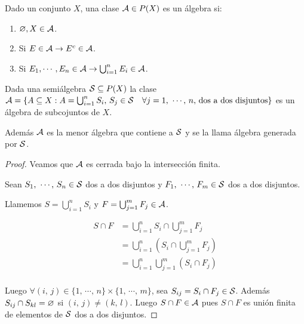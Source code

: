 \begin{definition}[Álgebra]
    Dado un conjunto $X$, una clase $\mathcal{A} \in P(X)$ es un álgebra si: \begin{enumerate}
        \item $\varnothing, X \in \mathcal{A}$.
        \item Si $E \in \mathcal{A} \to E^c \in \mathcal{A}$.
        \item Si $E_1, \cdots, E_n \in \mathcal{A} \to \bigcup_{i = 1}^n E_i \in \mathcal{A}$.
    \end{enumerate}
\end{definition}

\begin{lemma}
    Dada una semiálgebra $\mathcal{S} \subseteq P(X)$ la clase $\mathcal{A} = \{ A \subseteq X : A = \bigcup_{i = 1}^n S_i \text{, } S_j \in \mathcal{S} \quad \forall j = 1 \text{, }\cdots \text{, } n \text{, dos a dos disjuntos} \}$
    es un álgebra de subcojuntos de $X$.

    Además $\mathcal{A}$ es la menor álgebra que contiene a $\mathcal{S}$ y se la llama álgebra generada por $\mathcal{S}$.

    \begin{proof}
        Veamos que $\mathcal{A}$ es cerrada bajo la intersección finita.

        Sean $S_1 \text{, } \cdots \text{, } S_n \in \mathcal{S}$ dos a dos disjuntos y $F_1 \text{, } \cdots \text{, } F_m \in \mathcal{S}$ dos a dos disjuntos.

        Llamemos $S = \bigcup_{i = 1}^n S_i$ y $F = \bigcup_{j = 1}^m F_j \in \mathcal{A}$.

        \begin{align*}
            S \cap F & = \bigcup_{i = 1}^n S_i \cap \bigcup_{j = 1}^m F_j \\
            &= \bigcup_{i = 1}^n (S_i \cap \bigcup_{j = 1}^m F_j) \\
            &= \bigcup_{i = 1}^n \bigcup_{j = 1}^m (S_i \cap F_j) \\
        \end{align*}

        Luego $\forall (i\text{, } j) \in \{ 1 \text{, } \cdots \text{, } n \} \times \{ 1 \text{, } \cdots \text{, } m\}$, sea $S_{ij} = S_i \cap F_j \in \mathcal{S}$.
        Además $S_{ij} \cap S_{kl} = \varnothing$ si $(i\text{, } j) \neq (k \text{, } l)$.
        Luego $S \cap F \in \mathcal{A}$ pues $S \cap F$ es unión finita de elementos de $\mathcal{S}$ dos a dos disjuntos.


\end{proof}
\end{lemma}
